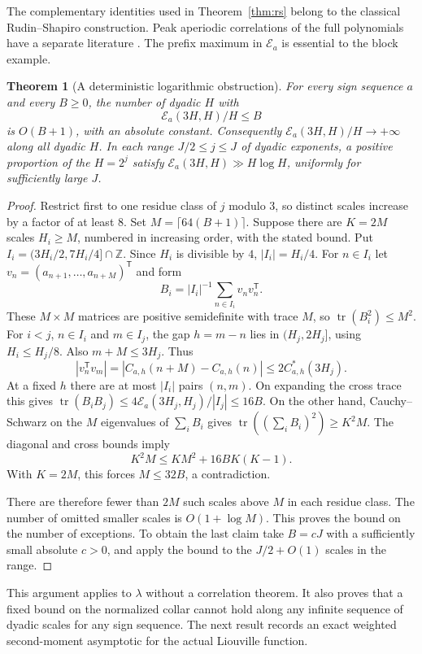\documentclass[11pt]{amsart}
\newtheorem{theorem}{Theorem}[section]
\theoremstyle{definition}
\theoremstyle{remark}
\newcommand{\E}{\mathcal E}
\numberwithin{equation}{section}
\begin{document}
The complementary identities used in Theorem~\ref{thm:rs} belong to the classical Rudin--Shapiro construction. Peak aperiodic correlations of the full polynomials have a separate literature \cite{rs}. The prefix maximum in \(\E_a\) is essential to the block example.
\begin{theorem}[A deterministic logarithmic obstruction]\label{thm:gram-log}
For every sign sequence \(a\) and every \(B\ge0\), the number of dyadic \(H\) with
\[
 \E_a(3H,H)/H\le B
\]
is \(O(B+1)\), with an absolute constant. Consequently \(\E_a(3H,H)/H\to+\infty\) along all dyadic \(H\). In each range \(J/2\le j\le J\) of dyadic exponents, a positive proportion of the \(H=2^j\) satisfy \(\E_a(3H,H)\gg H\log H\), uniformly for sufficiently large \(J\).
\end{theorem}
\begin{proof}
Restrict first to one residue class of \(j\) modulo \(3\), so distinct scales increase by a factor of at least \(8\). Set \(M=\lceil64(B+1)\rceil\). Suppose there are \(K=2M\) scales \(H_i\ge M\), numbered in increasing order, with the stated bound. Put \(I_i=(3H_i/2,7H_i/4]\cap\mathbb Z\). Since \(H_i\) is divisible by \(4\), \(|I_i|=H_i/4\). For \(n\in I_i\) let \(v_n=(a_{n+1},\ldots,a_{n+M})^\mathsf{T}\) and form
\[
 B_i=|I_i|^{-1}\sum_{n\in I_i}v_nv_n^\mathsf{T}.
\]
These \(M\times M\) matrices are positive semidefinite with trace \(M\), so \(\operatorname{tr}(B_i^2)\le M^2\). For \(i<j\), \(n\in I_i\) and \(m\in I_j\), the gap \(h=m-n\) lies in \((H_j,2H_j]\), using \(H_i\le H_j/8\). Also \(m+M\le3H_j\). Thus
\[
 |v_n^\mathsf{T}v_m|=|C_{a,h}(n+M)-C_{a,h}(n)|
             \le2 C^*_{a,h}(3H_j).
\]
At a fixed \(h\) there are at most \(|I_i|\) pairs \((n,m)\). On expanding the cross trace this gives
\(\operatorname{tr}(B_iB_j)\le4\E_a(3H_j,H_j)/|I_j|\le16B\).
On the other hand, Cauchy--Schwarz on the \(M\) eigenvalues of \(\sum_i B_i\) gives \(\operatorname{tr}((\sum_i B_i)^2)\ge K^2 M\). The diagonal and cross bounds imply
\[
 K^2 M\le KM^2+16BK(K-1).
\]
With \(K=2M\), this forces \(M\le32B\), a contradiction.

There are therefore fewer than \(2M\) such scales above \(M\) in each residue class. The number of omitted smaller scales is \(O(1+\log M)\). This proves the bound on the number of exceptions. To obtain the last claim take \(B=cJ\) with a sufficiently small absolute \(c>0\), and apply the bound to the \(J/2+O(1)\) scales in the range.
\end{proof}

This argument applies to \(\lambda\) without a correlation theorem. It also proves that a fixed bound on the normalized collar cannot hold along any infinite sequence of dyadic scales for any sign sequence. The next result records an exact weighted second-moment asymptotic for the actual Liouville function.
\end{document}
